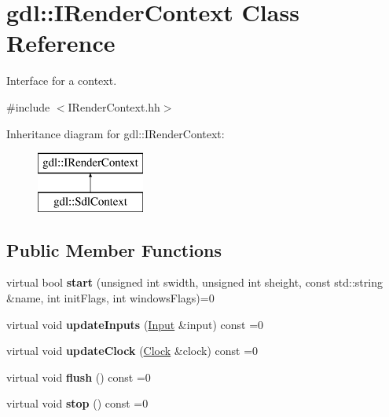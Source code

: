 \hypertarget{classgdl_1_1_i_render_context}{\section{gdl\-:\-:I\-Render\-Context Class Reference}
\label{classgdl_1_1_i_render_context}
}


Interface for a context.  




{\ttfamily \#include $<$I\-Render\-Context.\-hh$>$}

Inheritance diagram for gdl\-:\-:I\-Render\-Context\-:\begin{figure}[H]
\begin{center}
\leavevmode
\includegraphics[height=2.000000cm]{classgdl_1_1_i_render_context}
\end{center}
\end{figure}
\subsection*{Public Member Functions}
\begin{DoxyCompactItemize}
\item 
\hypertarget{classgdl_1_1_i_render_context_a962fd24dc84758aaa7c7d28330c3e37e}{virtual bool {\bfseries start} (unsigned int swidth, unsigned int sheight, const std\-::string \&name, int init\-Flags, int windows\-Flags)=0}\label{classgdl_1_1_i_render_context_a962fd24dc84758aaa7c7d28330c3e37e}

\item 
\hypertarget{classgdl_1_1_i_render_context_a19ffcdcc82d88098693a08f66beab770}{virtual void {\bfseries update\-Inputs} (\hyperlink{classgdl_1_1_input}{Input} \&input) const =0}\label{classgdl_1_1_i_render_context_a19ffcdcc82d88098693a08f66beab770}

\item 
\hypertarget{classgdl_1_1_i_render_context_af2134a929634632ccf13e779f489cdc2}{virtual void {\bfseries update\-Clock} (\hyperlink{classgdl_1_1_clock}{Clock} \&clock) const =0}\label{classgdl_1_1_i_render_context_af2134a929634632ccf13e779f489cdc2}

\item 
\hypertarget{classgdl_1_1_i_render_context_aa7ad85ff39d1e82f25162b71284b3659}{virtual void {\bfseries flush} () const =0}\label{classgdl_1_1_i_render_context_aa7ad85ff39d1e82f25162b71284b3659}

\item 
\hypertarget{classgdl_1_1_i_render_context_af1f487e928504f86f878f904fb4075cf}{virtual void {\bfseries stop} () const =0}\label{classgdl_1_1_i_render_context_af1f487e928504f86f878f904fb4075cf}

\end{DoxyCompactItemize}


